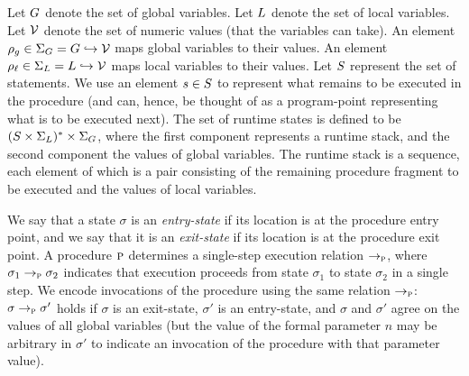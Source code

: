 Let $G$ denote the set of global variables. Let $L$ denote the set of local variables.
Let $\mathcal{V}$ denote the set of numeric values (that the variables can take).
An element $\rho_g \in \Sigma_G = G \hookrightarrow \mathcal{V}$ maps global variables to their values.
An element $\rho_\ell \in \Sigma_L = L \hookrightarrow \mathcal{V}$ maps local variables to their values.
Let $S$ represent the set of statements. We use an element $s \in S$ to represent
what remains to be executed in the procedure (and can, hence, be thought of as a program-point
representing what is to be executed next).
The set of runtime states is defined to be $(S \times \Sigma_L)^* \times \Sigma_G$, where
the first component represents a runtime stack, and the second component the values of global
variables. The runtime stack is a sequence, each element of which is a pair consisting of the
remaining procedure fragment to be executed and the values of local variables.

We say that a state $\sigma$ is an \emph{entry-state} if its location is at the procedure entry point,
and we say that it is an \emph{exit-state} if its location is at the procedure exit point.
A procedure $\textsc{p}$ determines a single-step execution relation $\rightarrow_{\textsc{p}}$, where $\sigma_1 \rightarrow_{\textsc{p}} \sigma_2$ indicates
that execution proceeds from state $\sigma_1$ to state $\sigma_2$ in a single step.
We encode invocations of the procedure using the same relation $\rightarrow_{\textsc{p}}$: 
$\sigma \rightarrow_{\textsc{p}} \sigma'$  holds if $\sigma$ is an exit-state, $\sigma'$ is an entry-state,
and $\sigma$ and $\sigma'$ agree on the values of all global variables (but the value of the formal
parameter $n$ may be arbitrary in $\sigma'$ to indicate an invocation of the procedure with that
parameter value).

